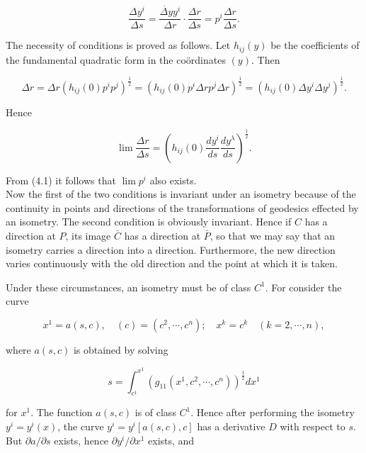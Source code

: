 \documentclass[10pt]{article}
\begin{document}
\begin{equation*}
\frac{\Delta y^{i}}{\Delta s}=\frac{\dot{\Delta y} y^{i}}{\Delta r} \cdot \frac{\Delta r}{\Delta s}=p^{i} \frac{\Delta r}{\Delta s} . \tag{4.1}
\end{equation*}


The necessity of conditions is proved as follows. Let $h_{i j}(y)$ be the coefficients of the fundamental quadratic form in the coördinates $(y)$. Then

$$
\Delta r=\Delta r\left(h_{i j}(0) p^{i} p^{j}\right)^{\frac{1}{2}}=\left(h_{i j}(0) p^{i} \Delta r p^{j} \Delta r\right)^{\frac{1}{2}}=\left(h_{i j}(0) \Delta y^{i} \Delta y^{j}\right)^{\frac{1}{2}} .
$$

Hence

$$
\lim \frac{\Delta r}{\Delta s}=\left(h_{i j}(0) \frac{d y^{i}}{d s} \frac{d y^{\lambda}}{d s}\right)^{\frac{1}{2}} .
$$

From (4.1) it follows that $\lim p^{i}$ also exists.\\
Now the first of the two conditions is invariant under an isometry because of the continuity in points and directions of the transformations of geodesics effected by an isometry. The second condition is obviously invariant. Hence if $C$ has a direction at $P$, its image $\bar{C}$ has a direction at $\bar{P}$, so that we may say that an isometry carries a direction into a direction. Furthermore, the new direction varies continuously with the old direction and the point at which it is taken.

Under these circumstances, an isometry must be of class $C^{1}$. For consider the curve


\begin{equation*}
x^{1}=a(s, c), \quad(c)=\left(c^{2}, \cdots, c^{n}\right) ; \quad x^{k}=c^{k} \quad(k=2, \cdots, n), \tag{4.2}
\end{equation*}


where $a(s, c)$ is obtained by solving


\begin{equation*}
s=\int_{c^{1}}^{x^{1}}\left(g_{11}\left(x^{1}, c^{2}, \cdots, c^{n}\right)\right)^{\frac{1}{2}} d x^{1} \tag{4.3}
\end{equation*}


for $x^{1}$. The function $a(s, c)$ is of class $C^{1}$. Hence after performing the isometry $y^{i}=y^{i}(x)$, the curve $y^{i}=y^{i}[a(s, c), c]$ has a derivative $D$ with respect to $s$. But $\partial a / \partial s$ exists, hence $\partial y^{i} / \partial x^{1}$ exists, and
\end{document}
